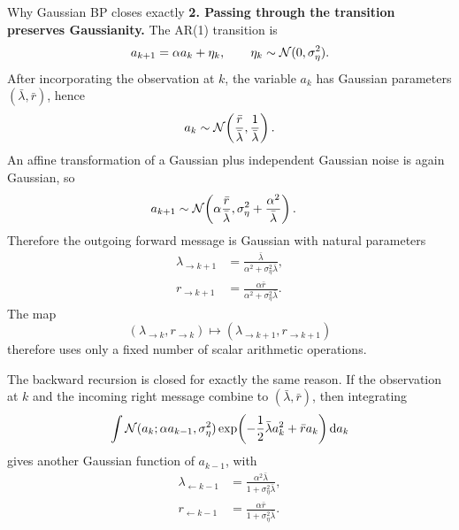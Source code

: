\begin{toolbox}{Why Gaussian BP closes exactly}
\medskip
\noindent\textbf{2. Passing through the transition preserves Gaussianity.}
The AR(1) transition is
\begin{equation}
  a_{k+1}
  =
  \alpha a_k+\eta_k,
  \qquad
  \eta_k\sim\mathcal{N}(0,\sigma_\eta^2).
\end{equation}
After incorporating the observation at $k$, the variable $a_k$ has Gaussian
parameters $(\bar\lambda,\bar r)$, hence
\begin{equation}
  a_k
  \sim
  \mathcal{N}\!\left(
    \frac{\bar r}{\bar\lambda},
    \frac{1}{\bar\lambda}
  \right).
\end{equation}
An affine transformation of a Gaussian plus independent Gaussian noise is
again Gaussian, so
\begin{align}
  a_{k+1}
  &\sim
  \mathcal{N}\!\left(
    \alpha\frac{\bar r}{\bar\lambda},
    \sigma_\eta^2+\frac{\alpha^2}{\bar\lambda}
  \right).
\end{align}
Therefore the outgoing forward message is Gaussian with natural parameters
\begin{align}
  \lambda_{\to k+1}
  &=
  \frac{\bar\lambda}
       {\alpha^2+\sigma_\eta^2\bar\lambda},
  \label{eq:bp-forward-precision}\\
  r_{\to k+1}
  &=
  \frac{\alpha\bar r}
       {\alpha^2+\sigma_\eta^2\bar\lambda}.
  \label{eq:bp-forward-field}
\end{align}
The map
\[
  (\lambda_{\to k},r_{\to k})
  \longmapsto
  (\lambda_{\to k+1},r_{\to k+1})
\]
therefore uses only a fixed number of scalar arithmetic operations.

The backward recursion is closed for exactly the same reason. If the
observation at $k$ and the incoming right message combine to
$(\bar\lambda,\bar r)$, then integrating
\begin{equation}
  \int
  \mathcal{N}(a_k;\alpha a_{k-1},\sigma_\eta^2)
  \exp\!\left(
    -\frac12\bar\lambda a_k^2+\bar r a_k
  \right)
  \mathrm{d} a_k
\end{equation}
gives another Gaussian function of $a_{k-1}$, with
\begin{align}
  \lambda_{\leftarrow k-1}
  &=
  \frac{\alpha^2\bar\lambda}
       {1+\sigma_\eta^2\bar\lambda},
  \label{eq:bp-backward-precision}\\
  r_{\leftarrow k-1}
  &=
  \frac{\alpha\bar r}
       {1+\sigma_\eta^2\bar\lambda}.
  \label{eq:bp-backward-field}
\end{align}


\end{toolbox}

